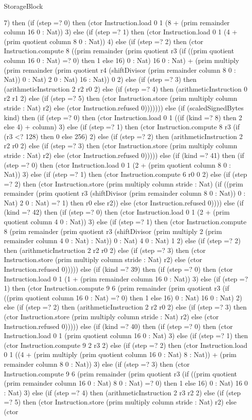 \begin{lexlean}{StorageBlock}
\begin{semanticmodule}
{7) then (if (step =? 0) then (ctor Instruction.load 0 1 (8 + (prim remainder column 16 0 : Nat)) 3) else (if (step =? 1) then (ctor Instruction.load 0 1 (4 + (prim quotient column 8 0 : Nat)) 4) else (if (step =? 2) then (ctor Instruction.compute 8 ((prim remainder (prim quotient r3 (if ((prim quotient column 16 0 : Nat) =? 0) then 1 else 16) 0 : Nat) 16 0 : Nat) + (prim multiply (prim remainder (prim quotient r4 (shiftDivisor (prim remainder column 8 0 : Nat)) 0 : Nat) 2 0 : Nat) 16 : Nat)) 0 2) else (if (step =? 3) then (arithmeticInstruction 2 r2 r0 2) else (if (step =? 4) then (arithmeticInstruction 0 r2 r1 2) else (if (step =? 5) then (ctor Instruction.store (prim multiply column stride : Nat) r2) else (ctor Instruction.refused 0))))))) else (if (scaledSignedBytes kind) then (if (step =? 0) then (ctor Instruction.load 0 1 ((if (kind =? 8) then 2 else 4) + column) 3) else (if (step =? 1) then (ctor Instruction.compute 8 r3 (if (r3 <? 128) then 0 else 256) 2) else (if (step =? 2) then (arithmeticInstruction 2 r2 r0 2) else (if (step =? 3) then (ctor Instruction.store (prim multiply column stride : Nat) r2) else (ctor Instruction.refused 0))))) else (if (kind =? 41) then (if (step =? 0) then (ctor Instruction.load 0 1 (2 + (prim quotient column 8 0 : Nat)) 3) else (if (step =? 1) then (ctor Instruction.compute 6 r0 0 2) else (if (step =? 2) then (ctor Instruction.store (prim multiply column stride : Nat) (if ((prim remainder (prim quotient r3 (shiftDivisor (prim remainder column 8 0 : Nat)) 0 : Nat) 2 0 : Nat) =? 1) then r0 else r2)) else (ctor Instruction.refused 0)))) else (if (kind =? 42) then (if (step =? 0) then (ctor Instruction.load 0 1 (2 + (prim quotient column 4 0 : Nat)) 3) else (if (step =? 1) then (ctor Instruction.compute 8 (prim remainder (prim quotient r3 (shiftDivisor (prim multiply 2 (prim remainder column 4 0 : Nat) : Nat)) 0 : Nat) 4 0 : Nat) 1 2) else (if (step =? 2) then (arithmeticInstruction 2 r2 r0 2) else (if (step =? 3) then (ctor Instruction.store (prim multiply column stride : Nat) r2) else (ctor Instruction.refused 0))))) else (if (kind =? 39) then (if (step =? 0) then (ctor Instruction.load 0 1 (1 + (prim remainder column 16 0 : Nat)) 3) else (if (step =? 1) then (ctor Instruction.compute 9 6 (prim remainder (prim quotient r3 (if ((prim quotient column 16 0 : Nat) =? 0) then 1 else 16) 0 : Nat) 16 0 : Nat) 2) else (if (step =? 2) then (arithmeticInstruction 2 r2 r0 2) else (if (step =? 3) then (ctor Instruction.store (prim multiply column stride : Nat) r2) else (ctor Instruction.refused 0))))) else (if (kind =? 40) then (if (step =? 0) then (ctor Instruction.load 0 1 (prim quotient column 16 0 : Nat) 3) else (if (step =? 1) then (ctor Instruction.compute 9 2 r3 2) else (if (step =? 2) then (ctor Instruction.load 0 1 ((4 + (prim multiply (prim quotient column 16 0 : Nat) 8 : Nat)) + (prim remainder column 8 0 : Nat)) 3) else (if (step =? 3) then (ctor Instruction.compute 9 6 (prim remainder (prim quotient r3 (if ((prim quotient (prim remainder column 16 0 : Nat) 8 0 : Nat) =? 0) then 1 else 16) 0 : Nat) 16 0 : Nat) 3) else (if (step =? 4) then (arithmeticInstruction 2 r3 r2 2) else (if (step =? 5) then (ctor Instruction.store (prim multiply column stride : Nat) r2) else (ctor }
\end{semanticmodule}
\end{lexlean}
